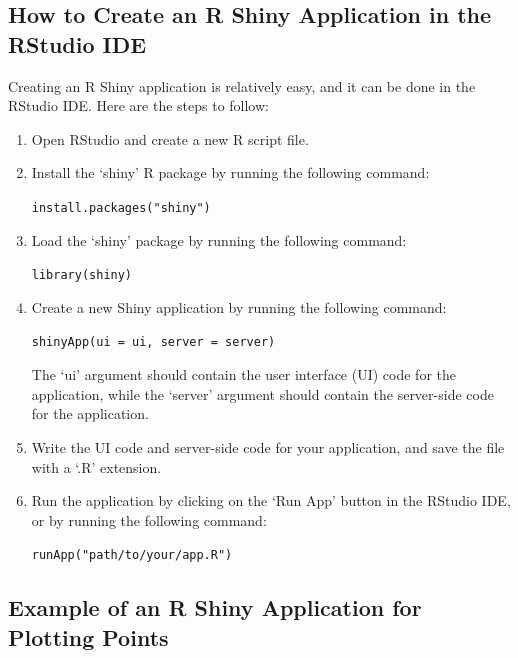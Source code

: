 \documentclass[
]{book}
\begin{document}
\hypertarget{how-to-create-an-r-shiny-application-in-the-rstudio-ide}{%
\subsection*{How to Create an R Shiny Application in the RStudio IDE}\label{how-to-create-an-r-shiny-application-in-the-rstudio-ide}}

Creating an R Shiny application is relatively easy, and it can be done in the RStudio IDE. Here are the steps to follow:

\begin{enumerate}
\def\labelenumi{\arabic{enumi}.}
\item
  Open RStudio and create a new R script file.
\item
  Install the `shiny' R package by running the following command:

  \texttt{install.packages("shiny")}
\item
  Load the `shiny' package by running the following command:

  \texttt{library(shiny)}
\item
  Create a new Shiny application by running the following command:

  \texttt{shinyApp(ui\ =\ ui,\ server\ =\ server)}

  The `ui' argument should contain the user interface (UI) code for the application, while the `server' argument should contain the server-side code for the application.
\item
  Write the UI code and server-side code for your application, and save the file with a `.R' extension.
\item
  Run the application by clicking on the `Run App' button in the RStudio IDE, or by running the following command:

  \texttt{runApp("path/to/your/app.R")}
\end{enumerate}

\hypertarget{example-of-an-r-shiny-application-for-plotting-points}{%
\subsection*{Example of an R Shiny Application for Plotting Points}\label{example-of-an-r-shiny-application-for-plotting-points}}
\end{document}
